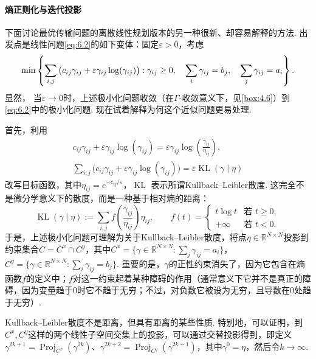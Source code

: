 \paragraph{熵正则化与迭代投影}
下面讨论最优传输问题的离散线性规划版本的另一种很新、却容易解释的方法. 出发点是线性问题\eqref{eq:6.2}的如下变体：固定$\varepsilon>0$，考虑
\begin{equation}\label{eq:6.3}\index{E051@熵（entropy）|hyperpage}
\min\left\{\sum_{i,j}\big(c_{ij}\gamma_{ij}
+\varepsilon\gamma_{ij}\log(\gamma_{ij})\big):
\gamma_{ij}\ge0,\quad\sum_i\gamma_{ij}=b_j,\quad
\sum_j\gamma_{ij}=a_i\right\}.
\end{equation}
显然，\label{idx:i4-p240}
当$\varepsilon\to0$时，上述极小化问题收敛（在$\Gamma$-收敛意义下，见\autoref{box:4.6}）到\eqref{eq:6.2}中的极小化问题. 现在试着解释为何这个近似问题更易处理.

首先，利用
\[
\begin{gathered}
c_{ij}\gamma_{ij}+\varepsilon\gamma_{ij}\log(\gamma_{ij})
=\varepsilon\gamma_{ij}\log\left(\frac{\gamma_{ij}}{\eta_{ij}}\right),\\
\sum_{i,j}\big(c_{ij}\gamma_{ij}+\varepsilon\gamma_{ij}\log(\gamma_{ij})\big)
=\varepsilon\operatorname{KL}(\gamma\mid\eta)
\end{gathered}
\]
改写目标函数，其中$\eta_{ij}=e^{-c_{ij}/\varepsilon}$，$\operatorname{KL}$\label{idx:i87-p240}
表示所谓Kullback--Leibler散度. 这完全不是微分学意义下的散度，而是一种基于相对熵的距离：
\[
\operatorname{KL}(\gamma\mid\eta):=
\sum_{i,j}f\left(\frac{\gamma_{ij}}{\eta_{ij}}\right)\eta_{ij},
\qquad
f(t)=
\begin{cases}
t\log t&\text{若 }t\ge0,\\
+\infty&\text{若 }t<0.
\end{cases}
\]
于是，上述极小化问题可理解为关于Kullback--Leibler散度，将点$\eta\in\mathbb R^{N\times N}$投影到约束集合$C=C^x\cap C^y$，其中$C^x=\{\gamma\in\mathbb R^{N\times N}:\sum_j\gamma_{ij}=a_i\}$，$C^y=\{\gamma\in\mathbb R^{N\times N}:\sum_i\gamma_{ij}=b_j\}$. 重要的是，$\gamma$的正性约束消失了，因为它包含在熵函数$f$的定义中；$f$对这一约束起着某种障碍的作用（通常意义下它并不是真正的障碍，因为变量趋于$0$时它不趋于无穷；不过，对负数它被设为无穷，且导数在$0$处趋于无穷）.

Kullback--Leibler散度不是距离，但具有距离的某些性质. 特别地，可以证明，到$C^x,C^y$这样的两个线性子空间交集上的投影，可以通过交替投影得到，即定义$\gamma^{2k+1}=\operatorname{Proj}_{C^x}(\gamma^{2k})$、$\gamma^{2k+2}=\operatorname{Proj}_{C^y}(\gamma^{2k+1})$，其中$\gamma^0=\eta$，然后令$k\to\infty$.

